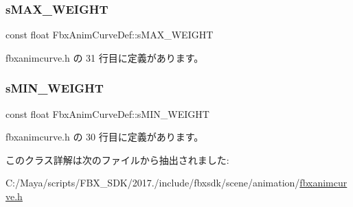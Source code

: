 \subsubsection{\texorpdfstring{s\+M\+A\+X\+\_\+\+W\+E\+I\+G\+HT}{sMAX\_WEIGHT}}
{\footnotesize\ttfamily const float Fbx\+Anim\+Curve\+Def\+::s\+M\+A\+X\+\_\+\+W\+E\+I\+G\+HT\hspace{0.3cm}{\ttfamily [static]}}



 fbxanimcurve.\+h の 31 行目に定義があります。

\mbox{\label{class_fbx_anim_curve_def_a469319cefa59b62fd38985b837e49d07}} 
\subsubsection{\texorpdfstring{s\+M\+I\+N\+\_\+\+W\+E\+I\+G\+HT}{sMIN\_WEIGHT}}
{\footnotesize\ttfamily const float Fbx\+Anim\+Curve\+Def\+::s\+M\+I\+N\+\_\+\+W\+E\+I\+G\+HT\hspace{0.3cm}{\ttfamily [static]}}



 fbxanimcurve.\+h の 30 行目に定義があります。



このクラス詳解は次のファイルから抽出されました\+:\begin{DoxyCompactItemize}
\item 
C\+:/\+Maya/scripts/\+F\+B\+X\+\_\+\+S\+D\+K/2017./include/fbxsdk/scene/animation/\hyperlink{fbxanimcurve_8h}{fbxanimcurve.\+h}\end{DoxyCompactItemize}

